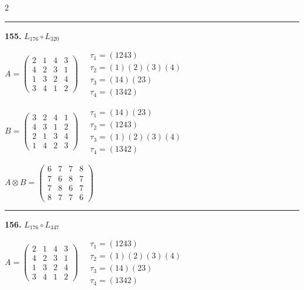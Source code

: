 \begin{multicols}{2}
\vspace{0.3em}
\hrule
\vspace{0.3em}

\noindent\textbf{155.} $L_{176} \circ L_{320}$

$A = \begin{pmatrix} 2 & 1 & 4 & 3 \\ 4 & 2 & 3 & 1 \\ 1 & 3 & 2 & 4 \\ 3 & 4 & 1 & 2 \end{pmatrix} \quad \begin{matrix} \tau_{1}=(1 2 4 3) \\ \tau_{2}=(1)(2)(3)(4) \\ \tau_{3}=(1 4)(2 3) \\ \tau_{4}=(1 3 4 2) \end{matrix}$

$B = \begin{pmatrix} 3 & 2 & 4 & 1 \\ 4 & 3 & 1 & 2 \\ 2 & 1 & 3 & 4 \\ 1 & 4 & 2 & 3 \end{pmatrix} \quad \begin{matrix} \tau_{1}=(1 4)(2 3) \\ \tau_{2}=(1 2 4 3) \\ \tau_{3}=(1)(2)(3)(4) \\ \tau_{4}=(1 3 4 2) \end{matrix}$

$A \otimes B = \begin{pmatrix} 6 & 7 & 7 & 8 \\ 7 & 6 & 8 & 7 \\ 7 & 8 & 6 & 7 \\ 8 & 7 & 7 & 6 \end{pmatrix}$

\vspace{0.3em}
\hrule
\vspace{0.3em}

\noindent\textbf{156.} $L_{176} \circ L_{447}$

$A = \begin{pmatrix} 2 & 1 & 4 & 3 \\ 4 & 2 & 3 & 1 \\ 1 & 3 & 2 & 4 \\ 3 & 4 & 1 & 2 \end{pmatrix} \quad \begin{matrix} \tau_{1}=(1 2 4 3) \\ \tau_{2}=(1)(2)(3)(4) \\ \tau_{3}=(1 4)(2 3) \\ \tau_{4}=(1 3 4 2) \end{matrix}$


\end{multicols}

